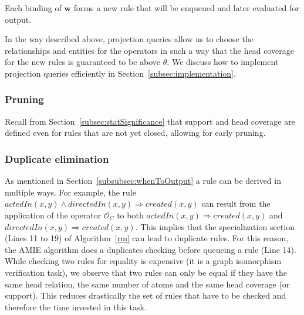 \noindent Each binding of $\bm{w}$ forms a new rule that will be enqueued and later evaluated for output.

In the way described above, projection queries allow us to choose the relationships and entities for the operators 
in such a way that the head coverage for the new rules is guaranteed to be above $\theta$.
We discuss how to implement projection queries efficiently in Section~\ref{subsec:implementation}.

\subsubsection{Pruning} 
\label{subsubsec:pruning}
Recall from Section~\ref{subsec:statSignificance} that support and head coverage are defined even for rules that are not yet closed, allowing for early pruning.

\subsubsection{Duplicate elimination} 
\label{subsubsec:duplicateElimination}
As mentioned in Section~\ref{subsubsec:whenToOutput} a rule can be derived in multiple ways.
For example, the rule $actedIn(x,y) \wedge directedIn(x,y) \Rightarrow created(x,y)$ can result from the application
of the operator $\mathcal{O}_C$ to both $actedIn(x,y) \Rightarrow created(x,y)$ and $directedIn(x,y) \Rightarrow created(x,y)$.
This implies that the specialization section (Lines 11 to 19) of Algorithm~\ref{rm} can lead to duplicate rules.
For this reason, the AMIE algorithm does a duplicates checking before queueing a rule (Line 14). 
While checking two rules for equality is expensive (it is a graph isomorphism verification task), 
we observe that two rules can only be equal if they have the same head relation, the same number of atoms and
the same head coverage (or support). This reduces drastically the set of rules that have to be checked and therefore
the time invested in this task. 

